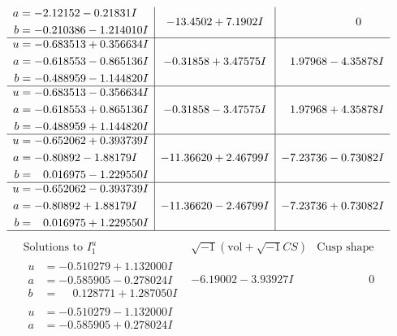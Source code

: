 \documentclass[1p]{elsarticle_modified}
\theoremstyle{definition}
\newcommand{\I}{\sqrt{-1}}
\begin{document}
$$\begin{array}{c|c|c}
\begin{aligned}
a &= -2.12152 - 0.21831 I \\
b &= -0.210386 - 1.214010 I\end{aligned}
 & -13.4502 + 7.1902 I & \phantom{-0.000000 } 0 \\ \hline\begin{aligned}
u &= -0.683513 + 0.356634 I \\
a &= -0.618553 - 0.865136 I \\
b &= -0.488959 - 1.144820 I\end{aligned}
 & -0.31858 + 3.47575 I & \phantom{-}1.97968 - 4.35878 I \\ \hline\begin{aligned}
u &= -0.683513 - 0.356634 I \\
a &= -0.618553 + 0.865136 I \\
b &= -0.488959 + 1.144820 I\end{aligned}
 & -0.31858 - 3.47575 I & \phantom{-}1.97968 + 4.35878 I \\ \hline\begin{aligned}
u &= -0.652062 + 0.393739 I \\
a &= -0.80892 - 1.88179 I \\
b &= \phantom{-}0.016975 - 1.229550 I\end{aligned}
 & -11.36620 + 2.46799 I & -7.23736 - 0.73082 I \\ \hline\begin{aligned}
u &= -0.652062 - 0.393739 I \\
a &= -0.80892 + 1.88179 I \\
b &= \phantom{-}0.016975 + 1.229550 I\end{aligned}
 & -11.36620 - 2.46799 I & -7.23736 + 0.73082 I\\
 \hline 
 \end{array}$$\newpage$$\begin{array}{c|c|c}  
\text{Solutions to }I^u_{1}& \I (\text{vol} + \sqrt{-1}CS) & \text{Cusp shape}\\
 \hline 
\begin{aligned}
u &= -0.510279 + 1.132000 I \\
a &= -0.585905 - 0.278024 I \\
b &= \phantom{-}0.128771 + 1.287050 I\end{aligned}
 & -6.19002 - 3.93927 I & \phantom{-0.000000 } 0 \\ \hline\begin{aligned}
u &= -0.510279 - 1.132000 I \\
a &= -0.585905 + 0.278024 I \\

\end{aligned}
\end{array}$$
\end{document}
